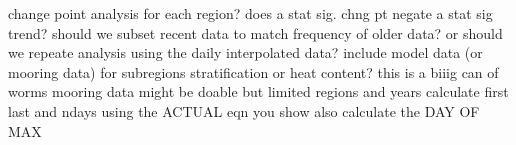 \markdownRendererDocumentBegin
\markdownRendererUlBeginTight
\markdownRendererUlItem change point analysis for each region?\markdownRendererInterblockSeparator
{}\markdownRendererUlBeginTight
\markdownRendererUlItem does a stat sig. chng pt negate a stat sig trend?\markdownRendererUlItemEnd 
\markdownRendererUlEndTight \markdownRendererUlItemEnd 
\markdownRendererUlItem should we subset recent data to match frequency of older data? or should we repeate analysis using the daily interpolated data?\markdownRendererUlItemEnd 
\markdownRendererUlItem include model data (or mooring data) for subregions stratification or heat content? this is a biiig can of worms\markdownRendererUlItemEnd 
\markdownRendererUlItem mooring data might be doable but limited regions and years\markdownRendererUlItemEnd 
\markdownRendererUlItem calculate first last and ndays using the ACTUAL eqn you show\markdownRendererUlItemEnd 
\markdownRendererUlItem also calculate the DAY OF MAX\markdownRendererUlItemEnd 
\markdownRendererUlEndTight \markdownRendererDocumentEnd